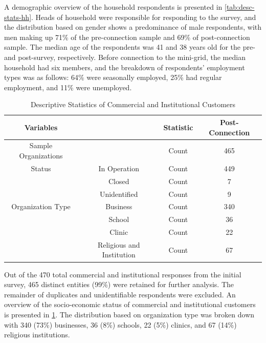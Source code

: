 A demographic overview of the household respondents is presented in \cref{tab:desc-stats-hh}. Heads of household were responsible for responding to the survey, and the distribution based on gender shows a predominance of male respondents, with men making up 71\% of the pre-connection sample and 69\% of post-connection sample. The median age of the respondents was 41 and 38 years old for the pre- and post-survey, respectively. Before connection to the mini-grid, the median household had six members, and the breakdown of respondents' employment types was as follows: 64\% were seasonally employed, 25\% had regular employment, and 11\% were unemployed.

\begin{table}[th]
\centering
\begin{tabular}{*4c} 
	\toprule
	Variables &  & Statistic &  Post-Connection\\
	\midrule                 
	Sample Organizations  & & Count & 465 \\
	Status & In Operation & Count & 449 \\
		   & Closed & Count & 7 \\
		   & Unidentified & Count & 9 \\
	Organization Type  & Business & Count & 340 \\
					   & School & Count & 36 \\
					   & Clinic & Count & 22 \\
					   & Religious and Institution & Count & 67 \\
	\bottomrule
	\end{tabular}
\caption{Descriptive Statistics of Commercial and Institutional Customers}
\label{tab:desc-stats-com}
\end{table}

Out of the 470 total commercial and institutional responses from the initial survey, 465 distinct entities (99\%) were retained for further analysis. The remainder of duplicates and unidentifiable respondents were excluded. An overview of the socio-economic status of commercial and institutional customers is presented in \cref{tab:desc-stats-com}. The distribution based on organization type was broken down with 340 (73\%) businesses, 36 (8\%) schools, 22 (5\%) clinics, and 67 (14\%) religious institutions.

